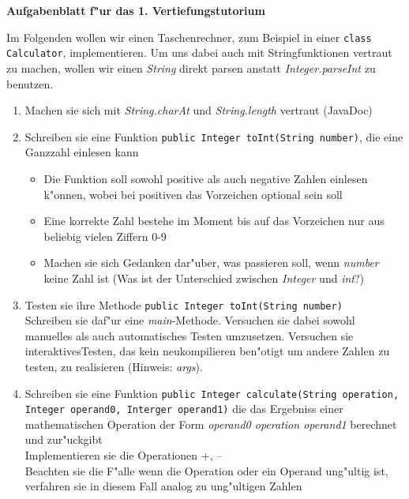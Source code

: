 \documentclass[a4paper]{article}
\begin{document}
\begin{center}
\textbf{\large Aufgabenblatt f"ur das 1. Vertiefungstutorium}
\end{center}

Im Folgenden wollen wir einen Taschenrechner, zum Beispiel in einer \texttt{class Calculator}, implementieren. Um uns dabei auch mit Stringfunktionen vertraut zu machen, wollen wir einen \textit{String} direkt parsen anstatt \textit{Integer.parseInt} zu benutzen.
\begin{enumerate}
\item Machen sie sich mit \textit{String.charAt} und \textit{String.length} vertraut (JavaDoc)

\item Schreiben sie eine Funktion \texttt{public Integer toInt(String number)}, die eine Ganzzahl einlesen kann
	\begin{itemize}
	\item Die Funktion soll sowohl positive als auch negative Zahlen einlesen k"onnen, wobei bei positiven das Vorzeichen optional sein soll
	\item Eine korrekte Zahl bestehe im Moment bis auf das Vorzeichen nur aus beliebig vielen Ziffern 0-9
	\item Machen sie sich Gedanken dar"uber, was passieren soll, wenn \textit{number} keine Zahl ist (Was ist der Unterschied zwischen \textit{Integer} und \textit{int}?)
	\end{itemize}

\item Testen sie ihre Methode \texttt{public Integer toInt(String number)}\\
Schreiben sie daf"ur eine \textit{main}-Methode. Versuchen sie dabei sowohl manuelles als auch automatisches Testen umzusetzen. Versuchen sie \glqq interaktives\grqq Testen, das kein neukompilieren ben"otigt um andere Zahlen zu testen, zu realisieren (Hinweis: \textit{args}).

\item Schreiben sie eine Funktion \texttt{public Integer calculate(String operation, Integer operand0, Interger operand1)} die das Ergebniss einer mathematischen Operation der Form \textit{operand0 operation operand1} berechnet und zur"uckgibt\\
Implementieren sie die Operationen +, --\\
Beachten sie die F"alle wenn die Operation oder ein Operand ung"ultig ist, verfahren sie in diesem Fall analog zu ung"ultigen Zahlen


\end{enumerate}
\end{document}
